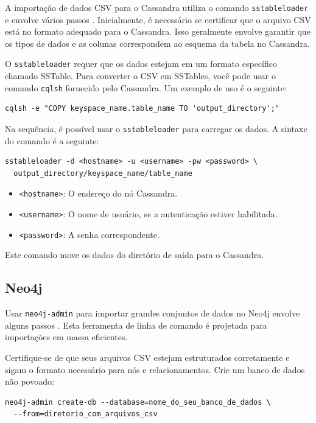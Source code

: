 A importação de dados CSV para o Cassandra utiliza o comando \texttt{sstableloader} e
envolve vários passos \cite{cassandra_sstableloader}. Inicialmente, é necessário se certificar que o arquivo CSV está no
formato adequado para o Cassandra. Isso geralmente envolve garantir que os tipos de dados
e as colunas correspondem ao esquema da tabela no Cassandra.

O \texttt{sstableloader} requer que os dados estejam em um formato específico chamado
SSTable. Para converter o CSV em SSTables, você pode usar o comando \texttt{cqlsh}
fornecido pelo Cassandra. Um exemplo de uso é o seguinte:

\begin{lstlisting}[style=bashstyle]
cqlsh -e "COPY keyspace_name.table_name TO 'output_directory';"
\end{lstlisting}

Na sequência, é possível usar o \texttt{sstableloader} para carregar os dados. A sintaxe
do comando é a seguinte:

\begin{lstlisting}[style=bashstyle]
sstableloader -d <hostname> -u <username> -pw <password> \
  output_directory/keyspace_name/table_name
\end{lstlisting}

\begin{itemize}
  \item \texttt{<hostname>}: O endereço do nó Cassandra.
  \item \texttt{<username>}: O nome de usuário, se a autenticação estiver habilitada.
  \item \texttt{<password>}: A senha correspondente.
\end{itemize}

Este comando move os dados do diretório de saída para o Cassandra.

\subsection{Neo4j}

Usar \texttt{neo4j-admin} para importar grandes conjuntos de dados no Neo4j envolve alguns
passos \cite{neo4j_import}. Esta ferramenta de linha de comando é projetada para importações em massa
eficientes.

Certifique-se de que seus arquivos CSV estejam estruturados corretamente e sigam o formato
necessário para nós e relacionamentos. Crie um banco de dados não povoado:

\begin{lstlisting}[style=bashstyle]
neo4j-admin create-db --database=nome_do_seu_banco_de_dados \
  --from=diretorio_com_arquivos_csv
\end{lstlisting}

